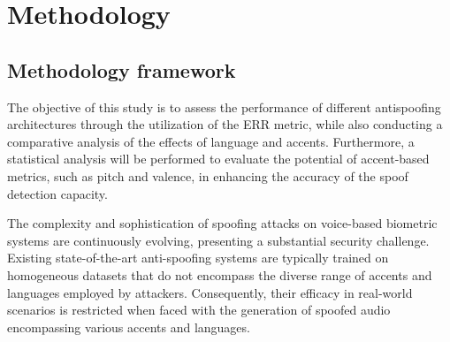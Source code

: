 
\chapter{Methodology}

\section{Methodology framework}

The objective of this study is to assess the performance of different antispoofing architectures through the utilization of the ERR metric, while also conducting a comparative analysis of the effects of language and accents. Furthermore, a statistical analysis will be performed to evaluate the potential of accent-based metrics, such as pitch and valence, in enhancing the accuracy of the spoof  detection capacity. 


The complexity and sophistication of spoofing attacks on voice-based biometric systems are continuously evolving, presenting a substantial security challenge. Existing state-of-the-art anti-spoofing systems are typically trained on homogeneous datasets that do not encompass the diverse range of accents and languages employed by attackers. Consequently, their efficacy in real-world scenarios is restricted when faced with the generation of spoofed audio encompassing various accents and languages.




